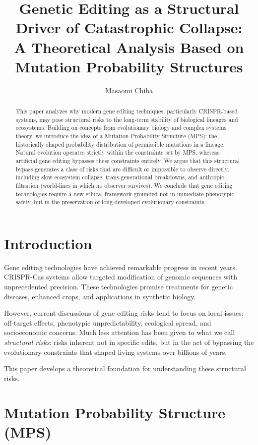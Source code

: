 \documentclass[11pt]{article}
\title{
Genetic Editing as a Structural Driver of Catastrophic Collapse:\\
A Theoretical Analysis Based on Mutation Probability Structures
}
\author[1]{Masaomi Chiba}
\affil[1]{Independent Researcher}
\date{}
\begin{document}
\maketitle

\begin{abstract}
This paper analyzes why modern gene editing techniques, particularly CRISPR-based systems, may pose structural risks to the long-term stability of biological lineages and ecosystems. Building on concepts from evolutionary biology and complex systems theory, we introduce the idea of a Mutation Probability Structure (MPS): the historically shaped probability distribution of permissible mutations in a lineage. Natural evolution operates strictly within the constraints set by MPS, whereas artificial gene editing bypasses these constraints entirely. We argue that this structural bypass generates a class of risks that are difficult or impossible to observe directly, including slow ecosystem collapse, trans-generational breakdowns, and anthropic filtration (world-lines in which no observer survives). We conclude that gene editing technologies require a new ethical framework grounded not in immediate phenotypic safety, but in the preservation of long-developed evolutionary constraints.
\end{abstract}

\section{Introduction}

Gene editing technologies have achieved remarkable progress in recent years. CRISPR-Cas systems allow targeted modification of genomic sequences with unprecedented precision. These technologies promise treatments for genetic diseases, enhanced crops, and applications in synthetic biology.

However, current discussions of gene editing risks tend to focus on local issues: off-target effects, phenotypic unpredictability, ecological spread, and socioeconomic concerns. Much less attention has been given to what we call \textit{structural risks}: risks inherent not in specific edits, but in the act of bypassing the evolutionary constraints that shaped living systems over billions of years.

This paper develops a theoretical foundation for understanding these structural risks.

\section{Mutation Probability Structure (MPS)}
\end{document}
